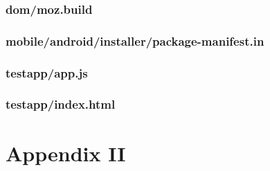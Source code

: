 \documentclass[12pt]{article}
\begin{document}
\subsubsection{dom/moz.build}

\pagebreak

\subsubsection{mobile/android/installer/package-manifest.in}

\pagebreak

\subsubsection{testapp/app.js}

\pagebreak

\subsubsection{testapp/index.html}

\pagebreak

\section{Appendix II}
\end{document}
